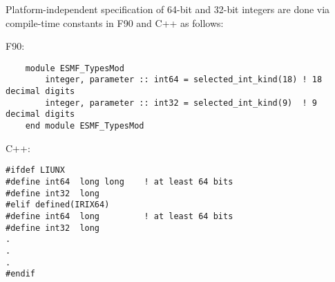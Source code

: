
Platform-independent specification of 64-bit and 32-bit integers are done via
compile-time constants in F90 and C++ as follows:

F90:
\begin{verbatim}
    module ESMF_TypesMod
        integer, parameter :: int64 = selected_int_kind(18) ! 18 decimal digits
        integer, parameter :: int32 = selected_int_kind(9)  ! 9  decimal digits
    end module ESMF_TypesMod
\end{verbatim}

C++:
\begin{verbatim}
#ifdef LIUNX
#define int64  long long	! at least 64 bits
#define int32  long
#elif defined(IRIX64)
#define int64  long			! at least 64 bits
#define int32  long
.
.
.
#endif
\end{verbatim}
